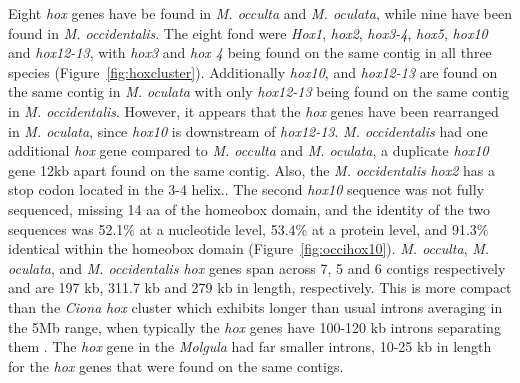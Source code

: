 Eight \textit{hox} genes have be found in \textit{M. occulta} and \textit{M. oculata}, while nine have been found in \textit{M. occidentalis}. The eight fond were \textit{Hox1}, \textit{hox2}, \textit{hox3-4}, \textit{hox5}, \textit{hox10} and \textit{hox12-13}, with \textit{hox3} and \textit{hox 4} being found on the same contig in all three species (Figure~\ref{fig:hoxcluster}). Additionally \textit{hox10}, and \textit{hox12-13} are found on the same contig in \textit{M. oculata} with only \textit{hox12-13} being found on the same contig in \textit{M. occidentalis}. However, it appears that the \textit{hox} genes have been rearranged in \textit{M. oculata}, since \textit{hox10} is downstream of \textit{hox12-13}.  \textit{M. occidentalis} had one additional \textit{hox} gene compared to \textit{M. occulta} and \textit{M. oculata}, a duplicate \textit{hox10} gene \mytilde12kb apart found on the same contig. Also, the \textit{M. occidentalis} \textit{hox2} has a stop codon located in the 3-4 helix.. The second \textit{hox10} sequence was not fully sequenced, missing 14 aa of the homeobox domain, and the identity of the two sequences was 52.1\% at a nucleotide level, 53.4\% at a protein level, and 91.3\% identical within the homeobox domain (Figure~\ref{fig:occihox10}). \textit{M. occulta}, \textit{M. oculata}, and \textit{M. occidentalis hox} genes span across 7, 5 and 6 contigs respectively and are 197 kb, 311.7 kb and 279 kb in length, respectively.  This is more compact than the \textit{Ciona} \textit{hox} cluster which exhibits longer than usual introns averaging in the 5Mb range, when typically the \textit{hox} genes have 100-120 kb introns separating them \cite{mcginnis_homeobox_1992}. The \textit{hox} gene in the \textit{Molgula} had far smaller introns, 10-25 kb in length for the \textit{hox} genes that were found on the same contigs.  

